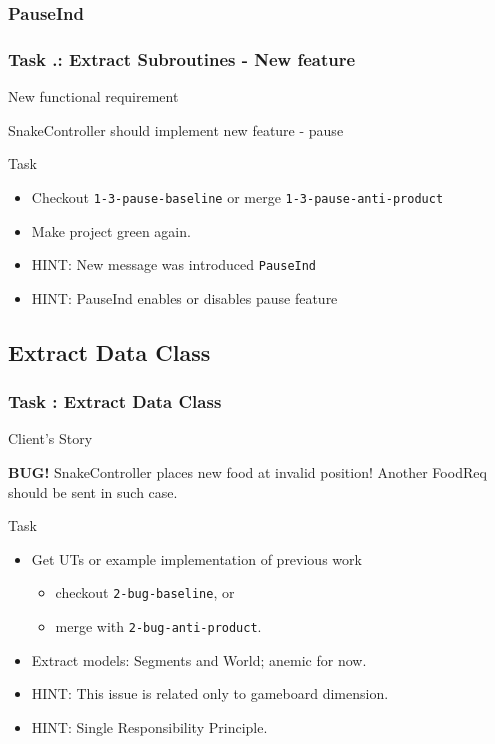 \documentclass[english]{beamer}
\newenvironment{narrowblock}[1]{%
\begin{center}
\begin{minipage}{10.5cm}
\begin{block}{#1}
}{%
\end{block}
\end{minipage}
\end{center}
}
\begin{document}
\subsubsection{PauseInd}

\begin{frame}
\frametitle{Task \thesubsection.\thesubsubsection: Extract Subroutines - New feature}

\begin{narrowblock}{New functional requirement}
SnakeController should implement new feature - pause
\end{narrowblock}

\pause
\begin{narrowblock}{Task}
\begin{itemize}[<+->]
 \item Checkout \texttt{1-3-pause-baseline} or merge \texttt{1-3-pause-anti-product}
 \item Make project green again.
 \item HINT: New message was introduced \texttt{PauseInd}
 \item HINT: PauseInd enables or disables pause feature
\end{itemize}
\end{narrowblock}
\end{frame}

\subsection{Extract Data Class}

\begin{frame}
\frametitle{Task \thesubsection: Extract Data Class}

\begin{narrowblock}{Client's Story}
\textbf{BUG!} SnakeController places new food at invalid position! Another FoodReq should be sent in such case.
\end{narrowblock}
\pause
\begin{narrowblock}{Task}
\begin{itemize}[<+->]
 \item Get UTs or example implementation of previous work
 \begin{itemize}[<+->]
  \item checkout \texttt{2-bug-baseline}, or
  \item merge with \texttt{2-bug-anti-product}.
 \end{itemize}
 \item Extract models: Segments and World; anemic for now.
 \item HINT: This issue is related only to gameboard dimension.
 \item HINT: Single Responsibility Principle.
\end{itemize}
\end{narrowblock}
\end{frame}
\end{document}
